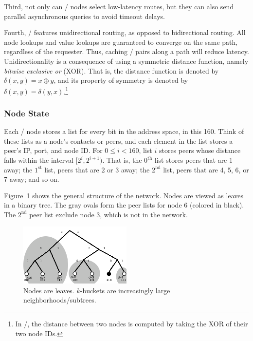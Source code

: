 \documentclass[11pt,twocolumn]{article}
\begin{document}
Third, not only can \Kademlia/ nodes select low-latency routes, but they can also send parallel asynchronous queries to avoid timeout delays.

Fourth, \Kademlia/ features unidirectional routing, as opposed to bidirectional routing.
All node lookups and value lookups are guaranteed to converge on the same path, regardless of the requester.
Thus, caching \kv/ pairs along a path will reduce latency.
Unidirectionality is a consequence of using a symmetric distance function, namely \emph{bitwise exclusive or} (XOR).
That is, the distance function is denoted by $\delta(x,y) = x \oplus y$, and its property of symmetry is denoted by $\delta(x,y) = \delta(y,x)$.\footnote{In \Kademlia/, the distance between two nodes is computed by taking the XOR of their two node IDs.}

\subsubsection{Node State}
Each \Kademlia/ node stores a list for every bit in the address space, in this 160.
Think of these lists as a node's contacts or peers, and each element in the list stores a peer's IP, port, and node ID.
For $0 \leq i < 160$, list $i$ stores peers whose distance falls within the interval $[2^i, 2^{i+1})$.
That is, the $0^{\mathrm{th}}$ list stores peers that are 1 away; the $1^{\mathrm{st}}$ list, peers that are 2 or 3 away; the $2^{\mathrm{nd}}$ list, peers that are 4, 5, 6, or 7 away; and so on.

Figure~\ref{tree} shows the general structure of the network.
Nodes are viewed as leaves in a binary tree.
The gray ovals form the peer lists for node 6 (colored in black).
The $2^{\mathrm{nd}}$ peer list exclude node 3, which is not in the network.

\begin{figure}[h!]
  \centering
  \includegraphics[width=0.5\textwidth]{images/tree}
  \caption{\label{tree}Nodes are leaves. $k$-buckets are increasingly large neighborhoods/subtrees.}
\end{figure}
\end{document}
